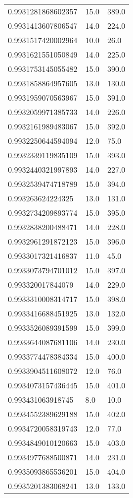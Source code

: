 \begin{center}
\begin{supertabular}[H]{p{0.30\textwidth}p{0.05\textwidth}p{0.05\textwidth}}
0.9931281868602357 & 15.0 & 389.0 \\ 
0.9931413607806547 & 14.0 & 224.0 \\ 
0.9931517420002964 & 10.0 & 26.0 \\ 
0.9931621551050849 & 14.0 & 225.0 \\ 
0.9931753145055482 & 15.0 & 390.0 \\ 
0.9931858864957605 & 13.0 & 130.0 \\ 
0.9931959070563967 & 15.0 & 391.0 \\ 
0.9932059971385733 & 14.0 & 226.0 \\ 
0.9932161989483067 & 15.0 & 392.0 \\ 
0.9932250644594094 & 12.0 & 75.0 \\ 
0.9932339119835109 & 15.0 & 393.0 \\ 
0.9932440321997893 & 14.0 & 227.0 \\ 
0.9932539474718789 & 15.0 & 394.0 \\ 
0.993263624224325 & 13.0 & 131.0 \\ 
0.9932734209893774 & 15.0 & 395.0 \\ 
0.9932838200488471 & 14.0 & 228.0 \\ 
0.9932961291872123 & 15.0 & 396.0 \\ 
0.9933017321416837 & 11.0 & 45.0 \\ 
0.9933073794701012 & 15.0 & 397.0 \\ 
0.993320017844079 & 14.0 & 229.0 \\ 
0.9933310008314717 & 15.0 & 398.0 \\ 
0.9933416688451925 & 13.0 & 132.0 \\ 
0.9933526089391599 & 15.0 & 399.0 \\ 
0.9933644087681106 & 14.0 & 230.0 \\ 
0.9933774478384334 & 15.0 & 400.0 \\ 
0.9933904511608072 & 12.0 & 76.0 \\ 
0.9934073157436445 & 15.0 & 401.0 \\ 
0.993431063918745 & 8.0 & 10.0 \\ 
0.9934552389629188 & 15.0 & 402.0 \\ 
0.9934720058319743 & 12.0 & 77.0 \\ 
0.9934849010120663 & 15.0 & 403.0 \\ 
0.9934977688500871 & 14.0 & 231.0 \\ 
0.9935093865536201 & 15.0 & 404.0 \\ 
0.9935201383068241 & 13.0 & 133.0 \\ 

\end{supertabular}
\end{center}
